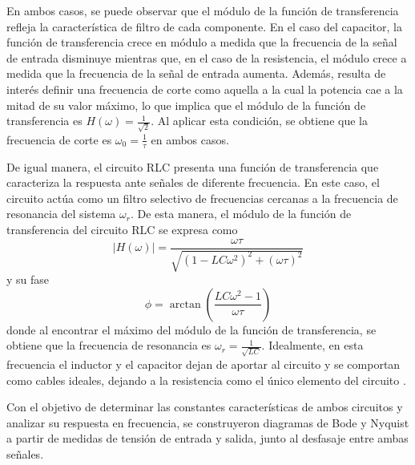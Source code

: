 En ambos casos, se puede observar que el módulo de la función de transferencia refleja la característica de filtro de cada componente. En el caso del capacitor, la función de transferencia crece en módulo a medida que la frecuencia de la señal de entrada disminuye mientras que, en el caso de la resistencia, el módulo crece a medida que la frecuencia de la señal de entrada aumenta. Además, resulta de interés definir una frecuencia de corte como aquella a la cual la potencia cae a la mitad de su valor máximo, lo que implica que el módulo de la función de transferencia es \(H(\omega) = \frac{1}{\sqrt{2}}\). Al aplicar esta condición, se obtiene que la frecuencia de corte es \(\omega_0 = \frac{1}{\tau}\) en ambos casos.


De igual manera, el circuito RLC presenta una función de transferencia que caracteriza la respuesta ante señales de diferente frecuencia. En este caso, el circuito actúa como un filtro selectivo de frecuencias cercanas a la frecuencia de resonancia del sistema \(\omega_r\). De esta manera, el módulo de la función de transferencia del circuito RLC se expresa como \cite{oppenheim1997signals}
    \begin{equation}    
        |H(\omega)| = \frac{\omega \tau}{\sqrt{(1 - LC\omega^2)^2 + (\omega \tau)^2}}
        \label{eq:moduloRLC}
    \end{equation}  
    y su fase
    \begin{equation}
        \phi = \arctan\left(\frac{ LC\omega^2 - 1}{\omega \tau}\right)
        \label{eq:desfasajeRLC}
    \end{equation}
    donde al encontrar el máximo del módulo de la función de transferencia, se obtiene que la frecuencia de resonancia es \(\omega_r = \frac{1}{\sqrt{LC}}\). Idealmente, en esta frecuencia el inductor y el capacitor dejan de aportar al circuito y se comportan como cables ideales, dejando a la resistencia como el único elemento del circuito \cite{TiplerMosca}.

    Con el objetivo de determinar las constantes características de ambos circuitos y analizar su respuesta en frecuencia, se construyeron diagramas de Bode y Nyquist a partir de medidas de tensión de entrada y salida, junto al desfasaje entre ambas señales.